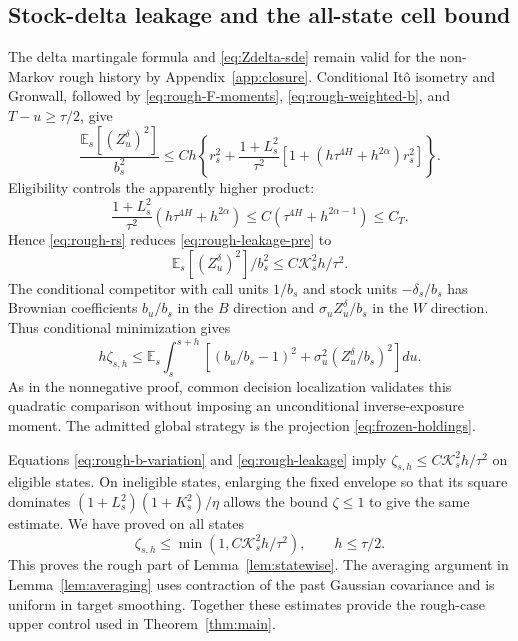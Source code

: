 \documentclass[11pt,a4paper]{amsart}
\theoremstyle{plain}
\theoremstyle{definition}
\theoremstyle{remark}
\newcommand{\EE}{\mathbb{E}}
\newcommand{\Es}{\EE_s}
\begin{document}
\subsection{Stock-delta leakage and the all-state cell bound}
The delta martingale formula and \eqref{eq:Zdelta-sde} remain valid for the non-Markov rough history by Appendix~\ref{app:closure}. Conditional It\^o isometry and Gronwall, followed by \eqref{eq:rough-F-moments}, \eqref{eq:rough-weighted-b}, and $T-u\ge\tau/2$, give
\begin{equation}\label{eq:rough-leakage-pre}
 \frac{\Es[(Z_u^\delta)^2]}{b_s^2}
 \le C h\left\{r_s^2+\frac{1+L_s^2}{\tau^2}
             [1+(h\tau^{4H}+h^{2\alpha})r_s^2]\right\}.
\end{equation}
Eligibility controls the apparently higher product:
\begin{equation}\label{eq:rough-higher-product}
 \frac{1+L_s^2}{\tau^2}(h\tau^{4H}+h^{2\alpha})
 \le C(\tau^{4H}+h^{2\alpha-1})\le C_T.
\end{equation}
Hence \eqref{eq:rough-rs} reduces \eqref{eq:rough-leakage-pre} to
\begin{equation}\label{eq:rough-leakage}
 \Es[(Z_u^\delta)^2]/b_s^2\le C\mathcal K_s^2h/\tau^2.
\end{equation}
The conditional competitor with call units $1/b_s$ and stock units $-\delta_s/b_s$ has Brownian coefficients $b_u/b_s$ in the $B$ direction and $\sigma_u Z_u^\delta/b_s$ in the $W$ direction. Thus conditional minimization gives
\[
 h\zeta_{s,h}\le\Es\int_s^{s+h}
      [(b_u/b_s-1)^2+\sigma_u^2(Z_u^\delta/b_s)^2]du.
\]
As in the nonnegative proof, common decision localization validates this quadratic comparison without imposing an unconditional inverse-exposure moment. The admitted global strategy is the projection \eqref{eq:frozen-holdings}.

Equations \eqref{eq:rough-b-variation} and \eqref{eq:rough-leakage} imply $\zeta_{s,h}\le C\mathcal K_s^2h/\tau^2$ on eligible states. On ineligible states, enlarging the fixed envelope so that its square dominates $(1+L_s^2)(1+K_s^2)/\eta$ allows the bound $\zeta\le1$ to give the same estimate. We have proved on all states
\begin{equation}\label{eq:rough-all-state}
 \zeta_{s,h}\le\min(1,C\mathcal K_s^2h/\tau^2),
 \qquad h\le\tau/2.
\end{equation}
This proves the rough part of Lemma~\ref{lem:statewise}. The averaging argument in Lemma~\ref{lem:averaging} uses contraction of the past Gaussian covariance and is uniform in target smoothing. Together these estimates provide the rough-case upper control used in Theorem~\ref{thm:main}.
\end{document}
